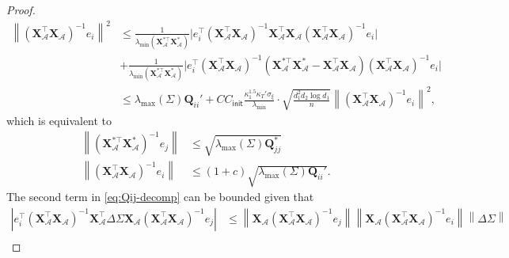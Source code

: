 \documentclass[12pt]{article}
\newcommand{\abs}[1]{\left\lvert#1\right\rvert}
\newcommand{\norm}[1]{\left\lVert#1\right\rVert}
\newcommand{\init}{{\mathsf{init}}}
\theoremstyle{plain}
\begin{document}
\begin{proof}
\begin{equation*}
\begin{aligned}
      \norm{\left(\mathbf{X}_{\mathcal{A}}^{\top} \mathbf{X}_{\mathcal{A}}\right)^{-1}e_i}^2 & \le \frac{1}{\lambda_{\min}\left(\mathbf{X}_{\mathcal{A}}^{*\top} \mathbf{X}_{\mathcal{A}}^*\right)  } \big| e^\top_i \left(\mathbf{X}_{\mathcal{A}}^{\top} \mathbf{X}_{\mathcal{A}}\right)^{-1}\mathbf{X}_{\mathcal{A}}^{\top} \mathbf{X}_{\mathcal{A}}\left(\mathbf{X}_{\mathcal{A}}^{\top} \mathbf{X}_{\mathcal{A}}\right)^{-1}e_i \big|  \\
      & + \frac{1}{\lambda_{\min}\left(\mathbf{X}_{\mathcal{A}}^{*\top} \mathbf{X}_{\mathcal{A}}^*\right)  } \big| e^\top_i \left(\mathbf{X}_{\mathcal{A}}^{\top} \mathbf{X}_{\mathcal{A}}\right)^{-1}\left( \mathbf{X}_{\mathcal{A}}^{*\top} \mathbf{X}_{\mathcal{A}}^* - \mathbf{X}_{\mathcal{A}}^{\top} \mathbf{X}_{\mathcal{A}}\right) \left(\mathbf{X}_{\mathcal{A}}^{\top} \mathbf{X}_{\mathcal{A}}\right)^{-1}e_i \big| \\
      & \le \lambda_{\max}(\Sigma) \mathbf{Q}_{ii}'+ CC_{\init}\frac{\kappa_1^{1.5} \kappa_T'  \sigma_{\xi} }{ \lambda_{\min}  }\cdot \sqrt{\frac{ d_1^2 d_2 \log d_1}{n}}\norm{\left(\mathbf{X}_{\mathcal{A}}^{\top} \mathbf{X}_{\mathcal{A}}\right)^{-1}e_i}^2,
\end{aligned}
\end{equation*}
which is equivalent to 
\begin{equation*}
    \begin{aligned}
       \norm{\left(\mathbf{X}_{\mathcal{A}}^{*\top} \mathbf{X}_{\mathcal{A}}^*\right)^{-1}e_j} &\le \sqrt{\lambda_{\max}(\Sigma) \mathbf{Q}_{jj}^*}\\
      \norm{\left(\mathbf{X}_{\mathcal{A}}^{\top} \mathbf{X}_{\mathcal{A}}\right)^{-1}e_i} &\le (1+c)\sqrt{\lambda_{\max}(\Sigma) \mathbf{Q}_{ii}'}.
    \end{aligned}
\end{equation*}
The second term in \eqref{eq:Qij-decomp} can be bounded given that
\begin{equation*}
    \begin{aligned}
      \abs{e_i^\top \left(\mathbf{X}_{\mathcal{A}}^{\top} \mathbf{X}_{\mathcal{A}}\right)^{-1}\mathbf{X}_{\mathcal{A}}^{\top} \Delta \Sigma \mathbf{X}_{\mathcal{A}}\left(\mathbf{X}_{\mathcal{A}}^{\top} \mathbf{X}_{\mathcal{A}}\right)^{-1}e_j} &\le \norm{\mathbf{X}_{\mathcal{A}}\left(\mathbf{X}_{\mathcal{A}}^{\top} \mathbf{X}_{\mathcal{A}}\right)^{-1}e_j} \norm{\mathbf{X}_{\mathcal{A}}\left(\mathbf{X}_{\mathcal{A}}^{\top} \mathbf{X}_{\mathcal{A}}\right)^{-1}e_i} \norm{\Delta \Sigma} \\

\end{aligned}
\end{equation*}
\end{proof}
\end{document}
